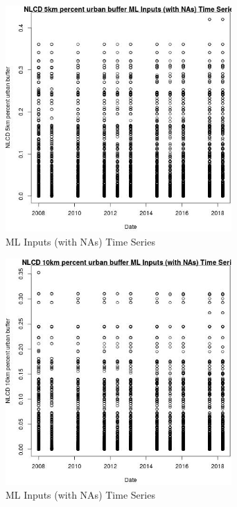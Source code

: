 \begin{figure} 
\centering  
\includegraphics[width=0.77\textwidth]{Code_Outputs/Report_ML_input_PM25_Step4_part_e_de_duplicated_aves_compiled_2019-05-18wNAs_NLCD_5km_percent_urban_buffervDate.jpg} 
\caption{\label{fig:Report_ML_input_PM25_Step4_part_e_de_duplicated_aves_compiled_2019-05-18wNAsNLCD_5km_percent_urban_buffervDate}ML Inputs (with NAs) Time Series} 
\end{figure} 
 

\begin{figure} 
\centering  
\includegraphics[width=0.77\textwidth]{Code_Outputs/Report_ML_input_PM25_Step4_part_e_de_duplicated_aves_compiled_2019-05-18wNAs_NLCD_10km_percent_urban_buffervDate.jpg} 
\caption{\label{fig:Report_ML_input_PM25_Step4_part_e_de_duplicated_aves_compiled_2019-05-18wNAsNLCD_10km_percent_urban_buffervDate}ML Inputs (with NAs) Time Series} 
\end{figure} 
 

